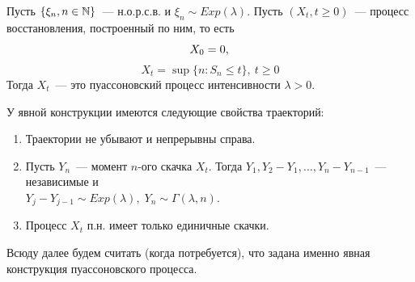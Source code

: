 \begin{theorem}
    
    Пусть $\{\xi_n, n \in \mathbb{N}\}$~--- н.о.р.с.в. и $\xi_n \sim Exp(\lambda)$. \newline Пусть $(X_t, t \geq 0)$~--- процесс восстановления, построенный по ним, то есть
    $$
        X_0 = 0,\\
    $$
    $$
        X_t = \sup\{n: S_n \leq t\}, \ t \geq 0
    $$
    Тогда $X_t$~--- это пуассоновский процесс интенсивности $\lambda > 0$.
        
\end{theorem}

\begin{statement}
     У явной конструкции имеются следующие свойства траекторий:

    \begin{enumerate}
        \item Траектории не убывают и непрерывны справа.
        \item Пусть $Y_n$~--- момент $n$-ого скачка $X_t$. Тогда $Y_1, Y_2 - Y_1, \ldots, Y_n - Y_{n-1}$~--- независимые и\\ $Y_j - Y_{j-1} \sim Exp(\lambda), \; Y_n \sim \Gamma(\lambda, n)$.
        \item Процесс $X_t$ п.н. имеет только единичные скачки.
    \end{enumerate}
\end{statement}

\begin{note} 
    Всюду далее будем считать (когда потребуется), что задана именно явная конструкция пуассоновского процесса.
\end{note}
